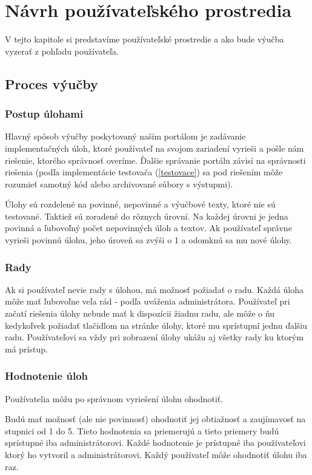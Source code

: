 \chapter{Návrh používateľského prostredia}

\label{kap:front}

V tejto kapitole si predstavíme používateľské prostredie a ako bude výučba vyzerať
z pohľadu používateľa.

\section{Proces výučby}
\subsection{Postup úlohami}
Hlavný spôsob výučby poskytovaný naším portálom je zadávanie implementačných úloh,
ktoré používateľ na svojom zariadení vyrieši a pošle nám riešenie, ktorého správnosť
overíme. Ďalšie správanie portálu závisí na správnosti riešenia
(podľa implementácie testovača (\ref{testovace}) sa pod riešením môže rozumieť
samotný kód alebo archivované súbory s výstupmi).

Úlohy sú rozdelené na povinné, nepovinné a výučbové texty, ktoré nie sú testované.
Taktiež sú zoradené do rôznych úrovní.
Na každej úrovni je jedna povinná a ľubovoľný počet nepovinných úloh a textov.
Ak používateľ správne vyrieši povinnú úlohu, jeho úroveň sa zvýši o 1 a
odomknú sa mu nové úlohy.

\subsection{Rady}
Ak si používateľ nevie rady s úlohou, má možnosť požiadať o radu. Každá úloha
môže mať ľubovoľne veľa rád - podľa uváženia administrátora. Používateľ pri začatí riešenia
úlohy nebude mať k dispozícii žiadnu radu, ale môže o ňu kedykoľvek požiadať tlačidlom na
stránke úlohy, ktoré mu sprístupní jednu ďalšiu radu.
Používateľovi sa vždy pri zobrazení úlohy ukážu aj všetky rady ku ktorým má prístup.

\subsection{Hodnotenie úloh}
\label{rating}
Používatelia môžu po správnom vyriešení úlohu ohodnotiť.

Budú mať možnosť (ale nie povinnosť) ohodnotiť jej obtiažnosť a
zaujímavosť na stupnici od 1 do 5. Tieto hodnotenia sa priemerujú a tieto priemery
budú sprístupné iba administrátorovi. Každé hodnotenie je prístupné iba používateľovi ktorý
ho vytvoril a administrátorovi. Každý používateľ môže ohodnotiť úlohu iba raz.


